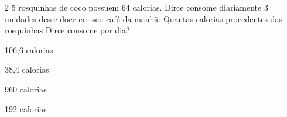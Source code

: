 {{%







\num{2} 5 rosquinhas de coco possuem 64 calorias. Dirce consome diariamente 3
unidades desse doce em seu café da manhã. Quantas calorias procedentes
das rosquinhas Dirce consome por dia?

\begin{escolha}[itemsep=0pt]
\item 106,6 calorias
\item 38,4 calorias
\item 960 calorias
\item 192 calorias
\end{escolha}











}}
